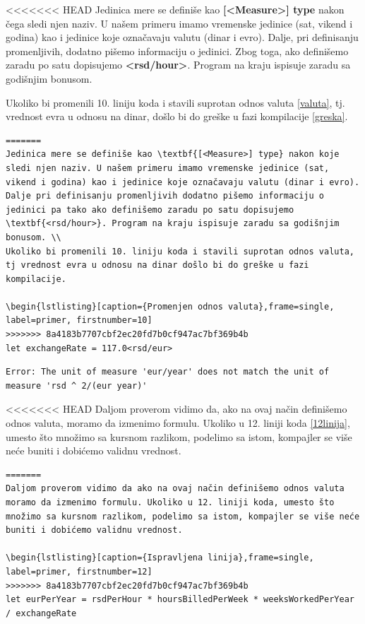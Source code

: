 \documentclass[a4paper]{article}
\begin{document}
<<<<<<< HEAD
Jedinica mere se definiše kao \textbf{[<Measure>] type} nakon čega sledi njen naziv. U našem primeru imamo vremenske jedinice (sat, vikend i godina) kao i jedinice koje označavaju valutu (dinar i evro). Dalje, pri definisanju promenljivih, dodatno pišemo informaciju o jedinici. Zbog toga, ako definišemo zaradu po satu dopisujemo \textbf{<rsd/hour>}. Program na kraju ispisuje zaradu sa godišnjim bonusom. 

Ukoliko bi promenili 10. liniju koda i stavili suprotan odnos valuta \ref{valuta}, tj. vrednost evra u odnosu na dinar, došlo bi do greške u fazi kompilacije \ref{greska}. \\
 
\begin{lstlisting}[caption={Promenjen odnos valuta},frame=single, firstnumber=10, label = valuta]
=======
Jedinica mere se definiše kao \textbf{[<Measure>] type} nakon koje sledi njen naziv. U našem primeru imamo vremenske jedinice (sat, vikend i godina) kao i jedinice koje označavaju valutu (dinar i evro). Dalje pri definisanju promenljivih dodatno pišemo informaciju o jedinici pa tako ako definišemo zaradu po satu dopisujemo \textbf{<rsd/hour>}. Program na kraju ispisuje zaradu sa godišnjim bonusom. \\
Ukoliko bi promenili 10. liniju koda i stavili suprotan odnos valuta, tj vrednost evra u odnosu na dinar došlo bi do greške u fazi kompilacije.
 
\begin{lstlisting}[caption={Promenjen odnos valuta},frame=single, label=primer, firstnumber=10]
>>>>>>> 8a4183b7707cbf2ec20fd7b0cf947ac7bf369b4b
let exchangeRate = 117.0<rsd/eur>
\end{lstlisting}
\begin{lstlisting}[caption={Kompajler prepoznaje grešku},frame=single, label=greska]
Error: The unit of measure 'eur/year' does not match the unit of measure 'rsd ^ 2/(eur year)'
\end{lstlisting}

<<<<<<< HEAD
Daljom proverom vidimo da, ako na ovaj način definišemo odnos valuta, moramo da izmenimo formulu. Ukoliko u 12. liniji koda \ref{12linija}, umesto što množimo sa kursnom razlikom, podelimo sa istom, kompajler se više neće buniti i dobićemo validnu vrednost. \\

\begin{lstlisting}[caption={Ispravljena linija},frame=single, firstnumber=12,label={12linija}]
=======
Daljom proverom vidimo da ako na ovaj način definišemo odnos valuta moramo da izmenimo formulu. Ukoliko u 12. liniji koda, umesto što množimo sa kursnom razlikom, podelimo sa istom, kompajler se više neće buniti i dobićemo validnu vrednost.

\begin{lstlisting}[caption={Ispravljena linija},frame=single, label=primer, firstnumber=12]
>>>>>>> 8a4183b7707cbf2ec20fd7b0cf947ac7bf369b4b
let eurPerYear = rsdPerHour * hoursBilledPerWeek * weeksWorkedPerYear / exchangeRate
\end{lstlisting}
\end{document}
